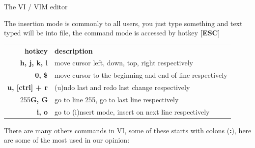 \documentclass{beamer}
\begin{document}
\begin{frame}[t]
{\begin{minipage}[t]{.50\linewidth}
\begin{block}{The VI / VIM editor}
{\begin{minipage}[t]{0.475\textwidth}
            The insertion mode is commonly to all users, you just
            type something and text typed will be into file, the command mode is accessed by hotkey \textbf{[ESC]}
            
            \vspace{10pt}
            
            \begin{tabular}{r p{14cm} }
                \textbf{hotkey} & \textbf{description}\\
                \textbf{h, j, k, l} & move cursor left, down, top, right respectively\\
                \textbf{0, \$} & move cursor to the beginning and end of line respectively\\
                \textbf{u, [ctrl] + r} & (u)ndo last and redo last change respectively\\
                255\textbf{G, G} & go to line 255, go to last line respectively\\
                \textbf{i, o} & go to (i)nsert mode, insert on next line respectively\\
            \end{tabular}
        \end{minipage}
        \begin{minipage}[t]{0.010\textwidth}
            \hspace{\fill}
        \end{minipage}
        \begin{minipage}[t]{0.470\textwidth}
            There are many others commands in VI, some of these starts
            with colons (\textbf{:}), here are some of the most used 
            in our opinion:
            \vspace{10pt}
            

\end{minipage}}
\end{block}
\end{minipage}}
\end{frame}
\end{document}
